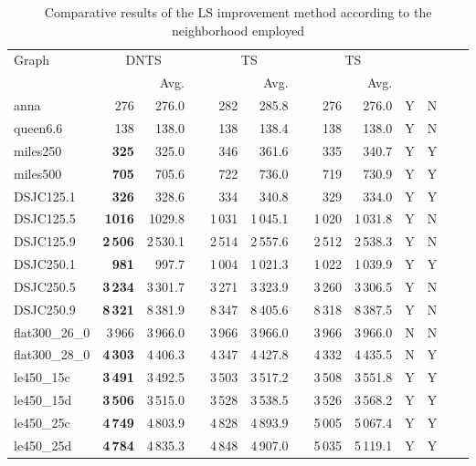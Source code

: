 \documentclass{elsart}
\begin{document}
\begin{table}[h]\begin{scriptsize}
\caption{Comparative results of the LS improvement method according to the neighborhood employed} \label{table_Multi_Single}
\begin{tabular}{lrrcrrcrrcrcr}
\hline
\multirow{2}{*}{Graph} & \multicolumn{2}{c}{DNTS} & &\multicolumn{2}{c}{TS} & &\multicolumn{2}{c}{TS} &\multirow{2}{*}{\emph{}} &\multirow{2}{*}{\emph{}}\\  
\cline{2-3} \cline{5-6} \cline{8-9} 
& & Avg. & & & Avg. & & & Avg. \\
\hline
anna              &276 &276.0 &  &282 & 285.8 &  &276   & 276.0  &Y & N \\
queen6.6      & 138 & 138.0 &  &138 & 138.4 &   & 138  & 138.0  &Y &N\\
miles250        & \textbf{325} & 325.0 &   &346 & 361.6  &   & 335 & 340.7 &Y &Y\\
miles500        & \textbf{705} & 705.6 &  &722 & 736.0 &  & 719 & 730.9 &Y &Y \\
DSJC125.1        & \textbf{326}  & 328.6   & & 334  & 340.8   & & 329  & 334.0 &Y &Y\\
DSJC125.5        & \textbf{1016}  & 1029.8   & & 1\,031  & 1\,045.1   & & 1\,020  & 1\,031.8 &Y &N\\
DSJC125.9        & \textbf{2\,506}  & 2\,530.1   & & 2\,514  & 2\,557.6   & & 2\,512  & 2\,538.3 &Y &N\\
DSJC250.1         & \textbf{981}  & 997.7    &   & 1\,004  & 1\,021.3    &   & 1\,022  & 1\,039.9  &Y &Y \\
DSJC250.5          &\textbf{3\,234}  & 3\,301.7  &  &3\,271  & 3\,323.9  &  &3\,260  & 3\,306.5 &Y &N \\
DSJC250.9          &\textbf{8\,321}  & 8\,381.9  &  &8\,347  & 8\,405.6  &  &8\,318  & 8\,387.5 &Y &N \\
flat300\_26\_0      & 3\,966 & 3\,966.0  & & 3\,966 & 3\,966.0 & & 3\,966 & 3\,966.0 &N &N \\
flat300\_28\_0      &  \textbf{4\,303} & 4\,406.3 & &  4\,347 & 4\,427.8 & &  4\,332 & 4\,435.5  &N &Y\\
le450\_15c          & \textbf{3\,491} & 3\,492.5   & & 3\,503  & 3\,517.2  & & 3\,508 & 3\,551.8    &Y &Y\\
le450\_15d           &  \textbf{3\,506} & 3\,515.0  & &  3\,528 & 3\,538.5 & &  3\,526  & 3\,568.2 &Y &Y \\
le450\_25c        &\textbf{4\,749} & 4\,803.9 &   &4\,828 & 4\,893.9 & &5\,005 & 5\,067.4  &Y &Y\\
le450\_25d       & \textbf{4\,784} & 4\,835.3  &  & 4\,848 & 4\,907.0  &  & 5\,035 & 5\,119.1  &Y &Y\\
\hline
\end{tabular}
\end{scriptsize}
\end{table}
\end{document}
